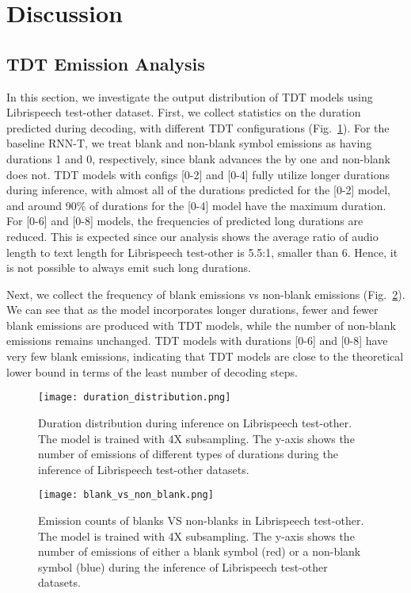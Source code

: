 \documentclass{article}
\begin{document}
\section{Discussion}\label{analysis}









\subsection{TDT Emission Analysis}
In this section, we investigate the output distribution of TDT models using Librispeech test-other dataset. 
First, we collect statistics on the duration predicted during decoding, with different TDT configurations (Fig.~\ref{fig:distribution}). For the baseline RNN-T, we treat blank and non-blank symbol emissions as having durations 1 and 0, respectively, since blank advances the  by one and non-blank does not. TDT models with configs [0-2] and [0-4] fully utilize longer durations during inference, with almost all of the durations predicted for the [0-2] model, and around 90\% of durations for the [0-4] model have the maximum duration.
For [0-6] and [0-8] models, the frequencies of  predicted long durations are reduced. This is expected since our analysis shows the average ratio of audio length to text length for Librispeech test-other is 5.5:1, smaller than 6.  Hence, it is not possible to always emit such long durations.

Next, we collect the frequency of blank emissions vs non-blank emissions (Fig.~\ref{blank_vs_nonblank}). We can see that as the model incorporates longer durations, fewer and fewer blank emissions are produced with TDT models, while the number of non-blank emissions remains unchanged. TDT models with durations [0-6] and [0-8] have very few blank emissions, indicating that TDT models are close to  the theoretical lower bound in terms of the least number of decoding steps. 

\begin{figure}[t]
    \centering
    \texttt{[image: duration\_distribution.png]}
    \caption{Duration distribution during inference on Librispeech test-other. The model is trained with 4X subsampling. The y-axis shows the number of emissions of different types of durations during the inference of Librispeech test-other datasets.}
    \label{fig:distribution}
\end{figure}
\begin{figure}[t]
    \centering
    \texttt{[image: blank\_vs\_non\_blank.png]}
    \caption{Emission counts of blanks VS non-blanks in Librispeech test-other. The model is trained with 4X subsampling. The y-axis shows the number of emissions of either a blank symbol (red) or a non-blank symbol (blue) during the inference of Librispeech test-other datasets.}
    \label{blank_vs_nonblank}
\end{figure}
\end{document}
